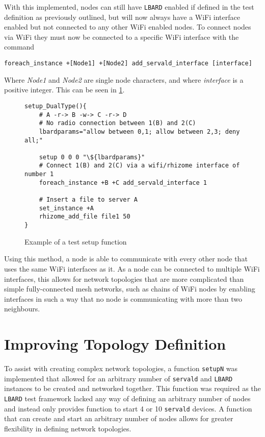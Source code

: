 With this implemented, nodes can still have \texttt{LBARD} enabled if defined in the test definition as previously outlined, but will now always have a WiFi interface enabled but not connected to any other WiFi enabled nodes.
To connect nodes via WiFi they must now be connected to a specific WiFi interface with the command
\begin{lstlisting}[numbers=none, basicstyle=\small]
foreach_instance +[Node1] +[Node2] add_servald_interface [interface]
\end{lstlisting}
Where \emph{Node1} and \emph{Node2} are single node characters, and where \emph{interface} is a positive integer.
This can be seen in \figurename{ \ref{fig:definingInterfaces}}.

\lstset{language=bash,
showstringspaces=false,
numbers=left,
}

\begin{figure}[h!]
    \begin{centering}
        \begin{lstlisting}[breaklines, frame=single]
setup_DualType(){
    # A -r-> B -w-> C -r-> D
    # No radio connection between 1(B) and 2(C)
    lbardparams="allow between 0,1; allow between 2,3; deny all;"

    setup 0 0 0 "\${lbardparams}"
    # Connect 1(B) and 2(C) via a wifi/rhizome interface of number 1
    foreach_instance +B +C add_servald_interface 1

    # Insert a file to server A
    set_instance +A
    rhizome_add_file file1 50
}
        \end{lstlisting}
        \caption{Example of a test setup function}
        \label{fig:definingInterfaces}
    \end{centering}
\end{figure}

Using this method, a node is able to communicate with every other node that uses the same WiFi interfaces as it.
As a node can be connected to multiple WiFi interfaces, this allows for network topologies that are more complicated than simple fully-connected mesh networks, such as chains of WiFi nodes by enabling interfaces in such a way that no node is communicating with more than two neighbours.


\section{Improving Topology Definition}
To assist with creating complex network topologies, a function \texttt{setupN} was implemented that allowed for an arbitrary number of \texttt{servald} and \texttt{LBARD} instances to be created and networked together.
This function was required as the \texttt{LBARD} test framework lacked any way of defining an arbitrary number of nodes and instead only provides function to start 4 or 10 \texttt{servald} devices.
A function that can create and start an arbitrary number of nodes allows for greater flexibility in defining network topologies.

